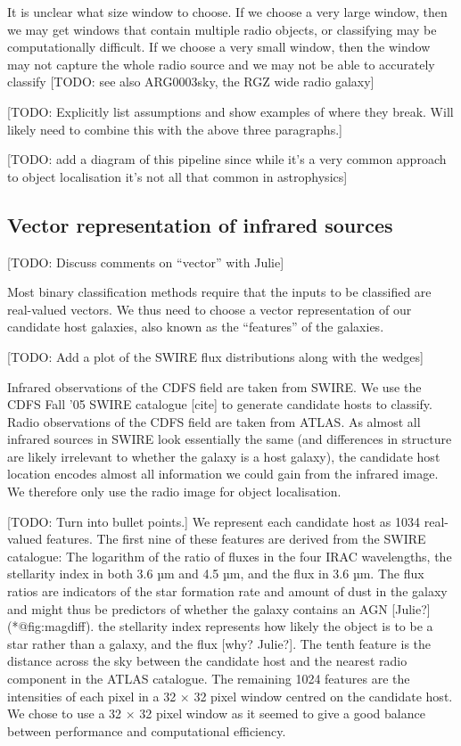 \documentclass[fleqn,usenatbib,usedcolumn]{mnras}
\begin{document}
    It is unclear what size window to choose. If we choose a very large
    window, then we may get windows that contain multiple radio objects, or
    classifying may be computationally difficult. If we choose a very small
    window, then the window may not capture the whole radio source and we
    may not be able to accurately classify {[}TODO: see also ARG0003sky, the
    RGZ wide radio galaxy{]}

    {[}TODO: Explicitly list assumptions and show examples of where they
    break. Will likely need to combine this with the above three
    paragraphs.{]}

    {[}TODO: add a diagram of this pipeline since while it's a very common
    approach to object localisation it's not all that common in
    astrophysics{]}

  \subsection{Vector representation of infrared
  sources}\label{vector-representation-of-infrared-sources}

    {[}TODO: Discuss comments on ``vector'' with Julie{]}

    Most binary classification methods require that the inputs to be
    classified are real-valued vectors. We thus need to choose a vector
    representation of our candidate host galaxies, also known as the
    ``features'' of the galaxies.

    {[}TODO: Add a plot of the SWIRE flux distributions along with the
    wedges{]}

    Infrared observations of the CDFS field are taken from SWIRE. We use the
    CDFS Fall '05 SWIRE catalogue {[}cite{]} to generate candidate hosts to
    classify. Radio observations of the CDFS field are taken from ATLAS. As
    almost all infrared sources in SWIRE look essentially the same (and
    differences in structure are likely irrelevant to whether the galaxy is
    a host galaxy), the candidate host location encodes almost all
    information we could gain from the infrared image. We therefore only use
    the radio image for object localisation.

    {[}TODO: Turn into bullet points.{]} We represent each candidate host as
    1034 real-valued features. The first nine of these features are derived
    from the SWIRE catalogue: The logarithm of the ratio of fluxes in the
    four IRAC wavelengths, the stellarity index in both 3.6 µm and 4.5 µm,
    and the flux in 3.6 µm. The flux ratios are indicators of the star
    formation rate and amount of dust in the galaxy and might thus be
    predictors of whether the galaxy contains an AGN {[}Julie?{]}
    (*@fig:magdiff). the stellarity index represents how likely the object
    is to be a star rather than a galaxy, and the flux {[}why? Julie?{]}.
    The tenth feature is the distance across the sky between the candidate
    host and the nearest radio component in the ATLAS catalogue. The
    remaining 1024 features are the intensities of each pixel in a 32
    \(\times\) 32 pixel window centred on the candidate host. We chose to
    use a 32 \(\times\) 32 pixel window as it seemed to give a good balance
    between performance and computational efficiency.
\end{document}
